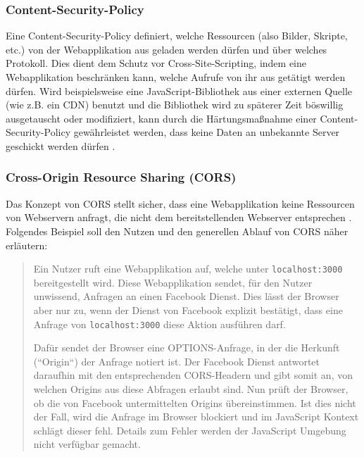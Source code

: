 \subsubsection{Content-Security-Policy}


Eine Content-Security-Policy definiert, welche Ressourcen (also Bilder, Skripte, etc.) von der Webapplikation aus geladen werden dürfen und über welches Protokoll. Dies dient dem Schutz vor Cross-Site-Scripting, indem eine Webapplikation beschränken kann, welche Aufrufe von ihr aus getätigt werden dürfen. Wird beispielsweise eine JavaScript-Bibliothek aus einer externen Quelle (wie z.B. ein CDN) benutzt und die Bibliothek wird zu späterer Zeit böswillig ausgetauscht oder modifiziert, kann durch die Härtungsmaßnahme einer Content-Security-Policy gewährleistet werden, dass keine Daten an unbekannte Server geschickt werden dürfen \cite{MDNContentSecurityPolicy}.

\subsubsection{Cross-Origin Resource Sharing (CORS)}

Das Konzept von CORS stellt sicher, dass eine Webapplikation keine Ressourcen von Webservern anfragt, die nicht dem bereitstellenden Webserver entsprechen \cite{MDNCORS}. Folgendes Beispiel soll den Nutzen und den generellen Ablauf von CORS näher erläutern:

\begin{quotation}
Ein Nutzer ruft eine Webapplikation auf, welche unter \texttt{localhost:3000} bereitgestellt wird. Diese Webapplikation sendet, für den Nutzer unwissend, Anfragen an einen Facebook Dienst. Dies lässt der Browser aber nur zu, wenn der Dienst von Facebook explizit bestätigt, dass eine Anfrage von \texttt{localhost:3000} diese Aktion ausführen darf.

Dafür sendet der Browser eine OPTIONS-Anfrage, in der die Herkunft (``Origin``) der Anfrage notiert ist. Der Facebook Dienst antwortet daraufhin mit den entsprechenden CORS-Headern und gibt somit an, von welchen Origins aus diese Abfragen erlaubt sind. Nun prüft der Browser, ob die von Facebook untermittelten Origins übereinstimmen. Ist dies nicht der Fall, wird die Anfrage im Browser blockiert und im JavaScript Kontext schlägt dieser fehl. Details zum Fehler werden der JavaScript Umgebung nicht verfügbar gemacht.
\end{quotation}


